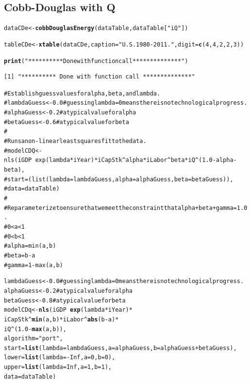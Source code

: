 \documentclass[preprint,authoryear,12pt]{elsarticle}\usepackage{graphicx, color}
\makeatletter
\newcommand{\hlfunctioncall}[1]{\textcolor[rgb]{0.501960784313725,0,0.329411764705882}{\textbf{#1}}}%
\newcommand{\hlstring}[1]{\textcolor[rgb]{0.6,0.6,1}{#1}}%
\newcommand{\hlcomment}[1]{\textcolor[rgb]{0.180392156862745,0.6,0.341176470588235}{#1}}%
\newenvironment{kframe}{%
 \def\at@end@of@kframe{}%
 \ifinner\ifhmode%
  \def\at@end@of@kframe{\end{minipage}}%
  \begin{minipage}{\columnwidth}%
 \fi\fi%
 \def\FrameCommand##1{\hskip\@totalleftmargin \hskip-\fboxsep
 \colorbox{shadecolor}{##1}\hskip-\fboxsep
     \hskip-\linewidth \hskip-\@totalleftmargin \hskip\columnwidth}%
 \MakeFramed {\advance\hsize-\width
   \@totalleftmargin\z@ \linewidth\hsize
   \@setminipage}}%
 {\par\unskip\endMakeFramed%
 \at@end@of@kframe}
\newenvironment{knitrout}{}{} %
\makeatother
\begin{document}
\subsection{Cobb-Douglas with Q}

\begin{knitrout}
\color{fgcolor}\begin{kframe}
\begin{alltt}

dataCDe <- \hlfunctioncall{cobbDouglasEnergy}(dataTable, dataTable[\hlstring{"iQ"}])
\end{alltt}


{\ttfamily\noindent\itshape\color{messagecolor}{Waiting for profiling to be done...}}\begin{alltt}

tableCDe <- \hlfunctioncall{xtable}(dataCDe, caption=\hlstring{"U.S. 1980-2011."}, digit = \hlfunctioncall{c}(4, 4, 2, 2, 3))


\hlfunctioncall{print}(\hlstring{"********** Done with function call **************"})
\end{alltt}
\begin{verbatim}
[1] "********** Done with function call **************"
\end{verbatim}
\begin{alltt}

\hlcomment{# Establish guess values for alpha, beta, and lambda.}
\hlcomment{# lambdaGuess <- 0.0 # guessing lambda = 0 means there is no technological progress.}
\hlcomment{# alphaGuess <- 0.2 # a typical value for alpha}
\hlcomment{# betaGuess <- 0.6 # a typical value for beta}
\hlcomment{# }
\hlcomment{# Runs a non-linear least squares fit to the data.}
\hlcomment{# modelCDQ <- nls(iGDP ~ exp(lambda*iYear) * iCapStk^alpha * iLabor^beta * iQ^(1.0 - alpha - beta), }
\hlcomment{#                 start=(list(lambda=lambdaGuess,alpha=alphaGuess,beta=betaGuess)),}
\hlcomment{#                 data=dataTable)}
\hlcomment{# }
\hlcomment{# Reparameterize to ensure that we meet the constraint that alpha + beta + gamma = 1.0.}
\hlcomment{# 0 < a < 1}
\hlcomment{# 0 < b < 1}
\hlcomment{# alpha = min(a, b)}
\hlcomment{# beta = b - a}
\hlcomment{# gamma = 1 - max(a, b)}

lambdaGuess <- 0.0 \hlcomment{# guessing lambda = 0 means there is no technological progress.}
alphaGuess <- 0.2 \hlcomment{# a typical value for alpha}
betaGuess <- 0.8 \hlcomment{# a typical value for beta}
modelCDq <- \hlfunctioncall{nls}(iGDP ~ \hlfunctioncall{exp}(lambda*iYear) * 
                  iCapStk^\hlfunctioncall{min}(a,b) * iLabor^\hlfunctioncall{abs}(b-a) * 
                  iQ^(1.0 - \hlfunctioncall{max}(a,b)), 
                algorithm = \hlstring{"port"},
                start = \hlfunctioncall{list}(lambda=lambdaGuess, a=alphaGuess, b=alphaGuess+betaGuess),
                lower = \hlfunctioncall{list}(lambda=-Inf, a=0, b=0),
                upper = \hlfunctioncall{list}(lambda=Inf, a=1, b=1),
                data = dataTable)


\end{alltt}
\end{kframe}
\end{knitrout}
\end{document}

